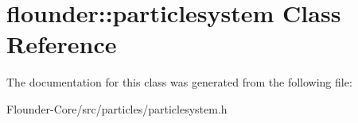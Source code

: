 \hypertarget{classflounder_1_1particlesystem}{}\section{flounder\+:\+:particlesystem Class Reference}
\label{classflounder_1_1particlesystem}


The documentation for this class was generated from the following file\+:\begin{DoxyCompactItemize}
\item 
Flounder-\/\+Core/src/particles/particlesystem.\+h\end{DoxyCompactItemize}
